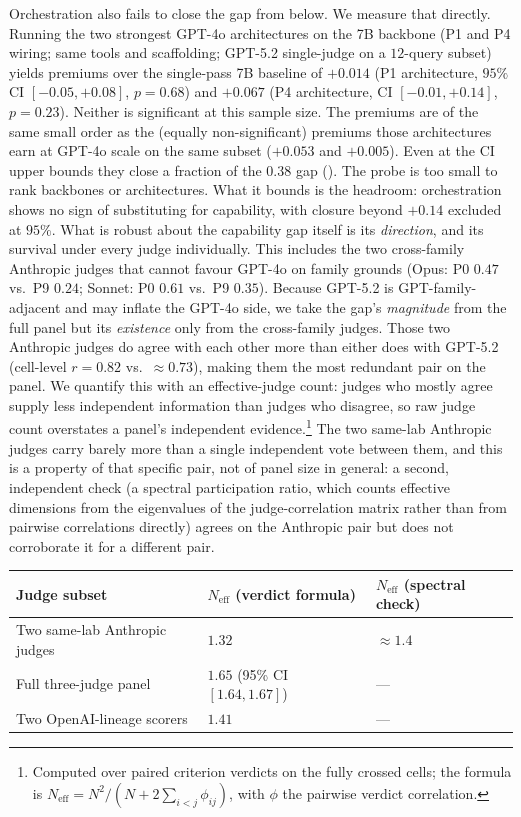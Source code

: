 \documentclass[11pt]{article}
\begin{document}
Orchestration also fails to close the gap from below. We measure that directly. Running the two strongest GPT-4o architectures on the 7B backbone
(P1 and P4 wiring; same tools and scaffolding; GPT-5.2 single-judge on a $12$-query
subset) yields premiums over the single-pass 7B baseline of $+0.014$ (P1 architecture,
$95\%$ CI $[-0.05, +0.08]$, $p{=}0.68$) and $+0.067$ (P4 architecture, CI $[-0.01,
+0.14]$, $p{=}0.23$). Neither is significant at this sample size. The premiums are of
the same small order as the (equally non-significant) premiums those architectures earn
at GPT-4o scale on the same subset ($+0.053$ and $+0.005$). Even at the CI upper bounds
they close a fraction of the $0.38$ gap (). The probe is too small to rank
backbones or architectures. What it bounds is the headroom: orchestration shows no sign
of substituting for capability, with closure beyond $+0.14$ excluded at $95\%$. What is
robust about the capability gap itself is its \emph{direction}, and its survival under
every judge individually. This includes the two cross-family Anthropic judges
that cannot favour GPT-4o on family grounds (Opus: P0 $0.47$ vs.\ P9 $0.24$; Sonnet: P0
$0.61$ vs.\ P9 $0.35$). Because GPT-5.2 is GPT-family-adjacent and may inflate the
GPT-4o side, we take the gap's \emph{magnitude} from the full panel but its
\emph{existence} only from the cross-family judges. Those two
Anthropic judges do agree with each other more than either does with GPT-5.2 (cell-level
$r=0.82$ vs.\ $\approx0.73$), making them the most redundant pair on the panel. We
quantify this with an effective-judge count: judges who mostly agree supply less
independent information than judges who disagree, so raw judge count overstates
a panel's independent evidence.\footnote{Computed over paired criterion verdicts
on the fully crossed cells; the formula is
$N_{\text{eff}}=N^2/(N+2\sum_{i<j}\phi_{ij})$, with $\phi$ the pairwise verdict correlation.}
The two same-lab Anthropic judges carry barely more than a single independent vote between
them, and this is a property of that specific pair, not of panel size in general: a second,
independent check (a spectral participation ratio, which counts effective dimensions from
the eigenvalues of the judge-correlation matrix rather than from pairwise correlations
directly) agrees on the Anthropic pair but does not corroborate it for a different pair.
\begin{center}
\begin{tabular}{lll}
\toprule
Judge subset & $N_{\text{eff}}$ (verdict formula) & $N_{\text{eff}}$ (spectral check) \\
\midrule
Two same-lab Anthropic judges & $1.32$ & $\approx 1.4$ \\
Full three-judge panel & $1.65$ (95\% CI $[1.64, 1.67]$) & --- \\
Two OpenAI-lineage scorers\footnotemark & $1.41$ & --- \\
\bottomrule
\end{tabular}
\end{center}
\end{document}
